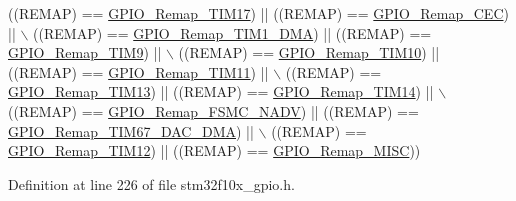 \begin{DoxyCode}
                              ((REMAP) == \hyperlink{group___g_p_i_o___remap__define_ga9fe98e01f8837d6a1ac4b4833f0fc45e}{GPIO\_Remap\_TIM17}) || ((REMAP) == 
      \hyperlink{group___g_p_i_o___remap__define_gac5961690908d4a0737e82b5a7d271b9b}{GPIO\_Remap\_CEC}) || \(\backslash\)
                              ((REMAP) == \hyperlink{group___g_p_i_o___remap__define_ga255adf908d7d530267707fee39ba2026}{GPIO\_Remap\_TIM1\_DMA}) || ((REMAP) == 
      \hyperlink{group___g_p_i_o___remap__define_gadfed4d88bc9a4093d16ce64a85b6051a}{GPIO\_Remap\_TIM9}) || \(\backslash\)
                              ((REMAP) == \hyperlink{group___g_p_i_o___remap__define_gac94252266a8fcb9ce7b55b5c55464110}{GPIO\_Remap\_TIM10}) || ((REMAP) == 
      \hyperlink{group___g_p_i_o___remap__define_ga0f308f1bb45e4c473766603b4bef47f8}{GPIO\_Remap\_TIM11}) || \(\backslash\)
                              ((REMAP) == \hyperlink{group___g_p_i_o___remap__define_ga72f5da86ed94f3be978cd841f7cd37cb}{GPIO\_Remap\_TIM13}) || ((REMAP) == 
      \hyperlink{group___g_p_i_o___remap__define_gaa2ae554ed69ad3368c2cd7db678b3fd0}{GPIO\_Remap\_TIM14}) || \(\backslash\)
                              ((REMAP) == \hyperlink{group___g_p_i_o___remap__define_ga97088efda8b8a057f4ba58de8f51625f}{GPIO\_Remap\_FSMC\_NADV}) || ((REMAP) == 
      \hyperlink{group___g_p_i_o___remap__define_gae69d46a269c2284c8cc6a90742e89b12}{GPIO\_Remap\_TIM67\_DAC\_DMA}) || \(\backslash\)
                              ((REMAP) == \hyperlink{group___g_p_i_o___remap__define_ga44d3d86a684f62f9142d34ea5975a637}{GPIO\_Remap\_TIM12}) || ((REMAP) == 
      \hyperlink{group___g_p_i_o___remap__define_ga543f3626303b3452528cb622ad088d26}{GPIO\_Remap\_MISC}))
\end{DoxyCode}


Definition at line 226 of file stm32f10x\+\_\+gpio.\+h.

